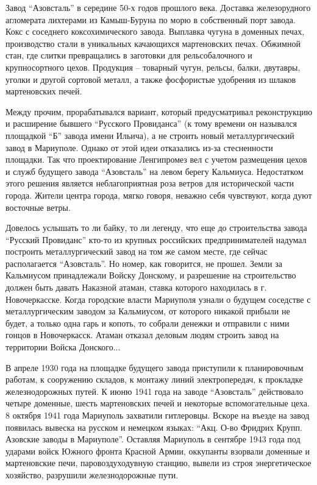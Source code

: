 Завод \enquote{Азовсталь} в середине 50-х годов прошлого века. Доставка железорудного
агломерата лихтерами из  Камыш-Буруна  по морю в собственный порт завода. Кокс
с соседнего коксохимического завода. Выплавка чугуна в доменных печах,
производство стали в уникальных качающихся мартеновских печах. Обжимной стан,
где слитки превращались в заготовки для рельсобалочного и крупносортного цехов.
Продукция – товарный чугун, рельсы, балки, двутавры, уголки и другой сортовой
металл, а также фосфористые удобрения из шлаков мартеновских печей. 

Между прочим, прорабатывался вариант, который предусматривал реконструкцию и
расширение бывшего \enquote{Русского Провиданса} (к тому времени он назывался площадкой
\enquote{Б} завода имени Ильича), а не строить новый металлургический завод в
Мариуполе. Однако от этой идеи отказались из-за стесненности площадки. Так что
проектирование Ленгипромез  вел  с учетом размещения цехов и служб будущего
завода \enquote{Азовсталь} на левом берегу Кальмиуса.  Недостатком этого решения
является неблагоприятная роза ветров для исторической части города. Жители
центра города, мягко говоря, неважно себя чувствуют, когда дуют восточные
ветры.

Довелось услышать то ли байку, то ли легенду, что еще до строительства завода
\enquote{Русский Провиданс} кто-то из крупных российских предпринимателей надумал
построить металлургический завод на том же самом месте, где сейчас
располагается \enquote{Азовсталь}. Но номер, как говорится, не прошел. Земли за
Кальмиусом  принадлежали  Войску Донскому, и разрешение на строительство должен
быть давать Наказной атаман, ставка которого находилась в г. Новочеркасске.
Когда городские власти Мариуполя узнали о будущем соседстве с металлургическим
заводом за Кальмиусом, от которого никакой прибыли не будет, а только одна гарь
и копоть, то собрали денежки и отправили с ними гонцов в Новочеркасск. Атаман
отказал деловым людям строить завод на территории Войска Донского...

В апреле 1930 года на площадке будущего завода приступили к планировочным
работам, к сооружению складов, к монтажу линий электропередач, к проклад­ке
железнодорожных  путей. К июню 1941 года на заводе \enquote{Азовсталь} действовало
четыре доменные, шесть мартеновских печей и некоторые вспомогательные цеха. 8
октября 1941 года Мариуполь захватили гитлеровцы. Вскоре на въезде на завод
появилась вывеска на русском и немецком языках: \enquote{Акц. О-во Фридрих Крупп.
Азовские заводы в Мариуполе}. Оставляя Мариуполь в сентябре 1943 года под
ударами войск Южного фронта Красной Армии, оккупанты взорвали доменные и
мартеновские печи, паровоздуходувную станцию, вывели из строя энергетическое
хозяйство, разрушили железнодорожные пути.

